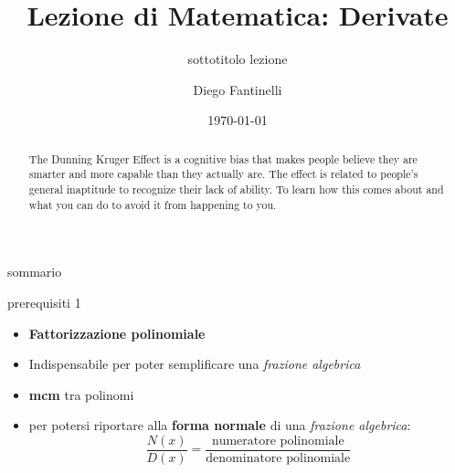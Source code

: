 \documentclass[aspectratio=169]{beamer}
\title{Lezione di Matematica: Derivate}
\subtitle{sottotitolo lezione}
\date{\today}
\author{Diego Fantinelli}
\institute{Matematica per il Liceo}
\begin{document}

\begin{frame}
	\titlepage
\end{frame}

\begin{frame}
    
    \begin{abstract}
        The Dunning Kruger Effect is a cognitive bias that makes people believe
        they are smarter and more capable than they actually are. The effect is
        related to people's general inaptitude to recognize their lack of
        ability. To learn how this comes about and what you can do to avoid it
        from happening to you.
    \end{abstract}
\end{frame}

\begin{frame}{sommario}
  \tableofcontents
\end{frame}








\begin{frame}{prerequisiti 1}
\begin{itemize}
\item
  \textbf{Fattorizzazione polinomiale}
\item
  Indispensabile per poter semplificare una \emph{frazione algebrica}
\item
  \textbf{mcm} tra polinomi
\item
  per potersi riportare alla \textbf{forma normale} di una
  \emph{frazione algebrica}: \[\dfrac{N(x)}{D(x)} = \dfrac{\text{numeratore polinomiale}}{\text{denominatore polinomiale}}\]
\end{itemize}
\end{frame}
\end{document}
